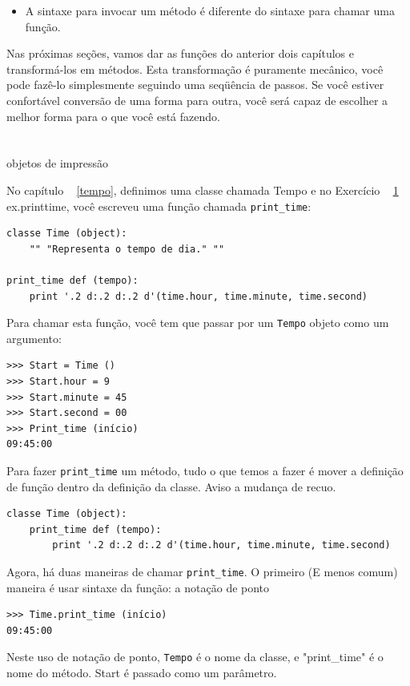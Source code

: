 \documentclass[10pt]{book}
\begin{document}
\begin{exercise}
\begin{v erbatim}
{\begin{itemize}
\item A sintaxe para invocar um método é diferente do
sintaxe para chamar uma função.

\end{itemize}

Nas próximas seções, vamos dar as funções do anterior
dois capítulos e transformá-los em métodos. Esta transformação é
puramente mecânico, você pode fazê-lo simplesmente seguindo uma seqüência de
passos. Se você estiver confortável conversão de uma forma para outra,
você será capaz de escolher a melhor forma para o que você está fazendo.


\section{} objetos de impressão

No capítulo ~ \ref {tempo}, definimos uma classe chamada
{\tt} Tempo e no Exercício ~ \ref {} ex.printtime, você 
escreveu uma função chamada \verb "print_time":

\begin{verbatim}
classe Time (object):
    "" "Representa o tempo de dia." ""

print_time def (tempo):
    print '.2 d:.2 d:.2 d'(time.hour, time.minute, time.second)
\end{verbatim}
%
Para chamar esta função, você tem que passar por um {\tt Tempo} objeto como um
argumento:

\begin{verbatim}
>>> Start = Time ()
>>> Start.hour = 9
>>> Start.minute = 45
>>> Start.second = 00
>>> Print_time (início)
09:45:00
\end{verbatim}
%
Para fazer \verb "print_time" um método, tudo o que temos a fazer é
mover a definição de função dentro da definição da classe. Aviso
a mudança de recuo.

\begin{verbatim}
classe Time (object):
    print_time def (tempo):
        print '.2 d:.2 d:.2 d'(time.hour, time.minute, time.second)
\end{verbatim}
%
Agora, há duas maneiras de chamar \verb "print_time". O primeiro
(E menos comum) maneira é usar sintaxe da função:
\index{} a notação de ponto


\begin{verbatim}
>>> Time.print_time (início)
09:45:00
\end{verbatim}
%
Neste uso de notação de ponto, {\tt Tempo} é o nome da classe,
e \verbo "print_time" é o nome do método. {Start \tt} é
passado como um parâmetro.

}
\end{v erbatim}
\end{exercise}
\end{document}
